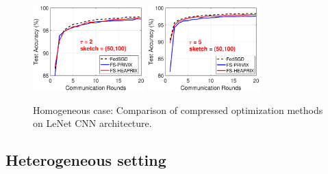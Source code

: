 \documentclass[twoside]{article}
\begin{document}
\begin{figure}[H]
\begin{center}
{%
		\includegraphics[width=1.7in]{MNIST_figures/local2_sketch50_iid1_test_acc.eps} \hspace{-0.2in}
		\includegraphics[width=1.7in]{MNIST_figures/local5_sketch50_iid1_test_acc.eps}\hspace{-0.2in}
		}
	\end{center}
	\caption{Homogeneous case: Comparison of compressed optimization methods on LeNet CNN architecture.}
    \label{fig:MNIST-iid1-app}
\end{figure}

\subsection{Heterogeneous setting}
\end{document}
